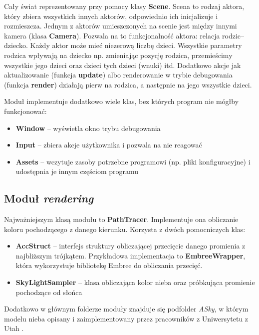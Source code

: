 \documentclass[inz,longabstract]{iithesis}
\begin{document}
            Cały świat reprezentowany przy pomocy klasy \textbf{Scene}. Scena to rodzaj aktora, który zbiera wszystkich innych aktorów, odpowiednio ich inicjalizuje i rozmieszcza. Jednym z aktorów umieszczonych na scenie jest między innymi kamera (klasa \textbf{Camera}). Pozwala na to funkcjonalność aktora: relacja rodzic--dziecko. Każdy aktor może mieć niezerową liczbę dzieci. Wszystkie parametry rodzica wpływają na dziecko np. zmieniając pozycję rodzica, przemieścimy wszystkie jego dzieci oraz dzieci tych dzieci (wnuki) itd. Dodatkowo akcje jak aktualizowanie (funkcja \textbf{update}) albo renderowanie w trybie debugowania (funkcja \textbf{render}) działają pierw na rodzica, a następnie na jego wszystkie dzieci.
            
            Moduł implementuje dodatkowo wiele klas, bez których program nie mógłby funkcjonować:
            \begin{itemize}
                \item \textbf{Window} -- wyświetla okno trybu debugowania
                \item \textbf{Input} -- zbiera akcje użytkownika i pozwala na nie reagować
                \item \textbf{Assets} -- wczytuje zasoby potrzebne programowi (np. pliki konfiguracyjne) i udostępnia je innym częściom programu 
            \end{itemize}
            
        \subsection{Moduł \textit{rendering}}
            Najważniejszym klasą modułu to \textbf{PathTracer}. Implementuje ona obliczanie koloru pochodzącego z danego kierunku. Korzysta z dwóch pomocniczych klas:
            \begin{itemize}
                \item \textbf{AccStruct} -- interfejs struktury obliczającej przecięcie danego promienia z najbliższym trójkątem. Przykładowa implementacja to \textbf{EmbreeWrapper}, która wykorzystuje bibliotekę Embree do obliczania przecięć. 
                \item \textbf{SkyLightSampler} -- klasa obliczająca kolor nieba oraz próbkująca promienie pochodzące od słońca
            \end{itemize}
            
            Dodatkowo w głównym folderze moduły znajduje się podfolder \textit{ASky}, w którym modelu nieba opisany i zaimplementowany przez pracowników z Uniwersytetu z Utah \cite{sky}.
            
\end{document}
